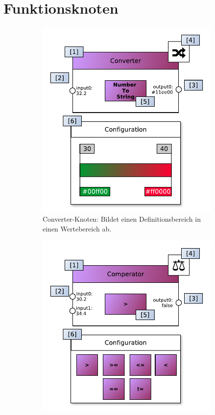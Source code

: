 \section{Funktionsknoten}\label{anhang:funktionsknoten}
\begin{figure}[H]
\centering
\begin{subfigure}{.5\textwidth}
  \centering
  \includegraphics[width=1\linewidth]{bilder/Anhang/instanceconverterfunctionnode.pdf}
  \caption{Converter-Knoten: Bildet einen Definitionsbereich in einen Wertebereich ab.}
  \label{fig:funcconv}
\end{subfigure}%
\begin{subfigure}{.5\textwidth}
  \centering
  \includegraphics[width=1\linewidth]{bilder/Anhang/instancecomperatorfunctionnode.pdf}

\end{subfigure}
\end{figure}
